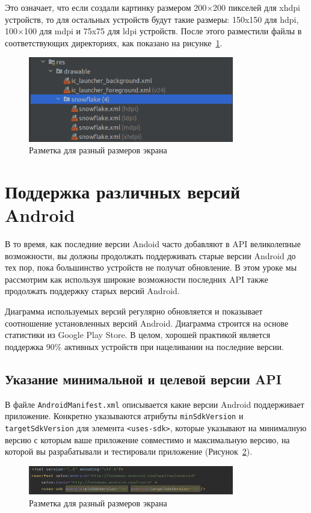 Это означает, что если создали картинку размером 200×200 пикселей для
xhdpi устройств, то для остальных устройств будут такие размеры: 150x150
для hdpi, 100×100 для mdpi и 75x75 для ldpi устройств.
После этого разместили файлы в соответствующих директориях, как показано
на рисунке~\ref{fig:res:drawable}.
\begin{figure}[h!tp]
	\centering
	\includegraphics[width=0.8\textwidth]{Screenshot from 2023-02-20 20-10-08.png}
	\caption{Разметка для разный размеров экрана}
	\label{fig:res:drawable}
\end{figure}

\section{Поддержка различных версий Android}
В то время, как последние версии Andoid часто добавляют в API
великолепные возможности, вы должны продолжать поддерживать старые
версии Android до тех пор, пока большинство устройств не получат
обновление. В этом уроке мы рассмотрим как используя широкие
возможности последних API также продолжать поддержку старых версий
Android.\par
Диаграмма используемых версий регулярно обновляется и показывает
соотношение установленных версий Android. Диаграмма строится на основе
статистики из Google Play Store. В целом, хорошей практикой является
поддержка 90\% активных устройств при нацеливании на последние версии.

\subsection{Указание минимальной и целевой версии API}
В файле \texttt{AndroidManifest.xml} описывается какие версии Android
поддерживает приложение. Конкретно указываются атрибуты
\texttt{minSdkVersion} и \texttt{targetSdkVersion} для
элемента \texttt{<uses-sdk>}, которые указывают на минималную версию
с которым ваше приложение совместимо и максимальную версию,
на которой вы разрабатывали и тестировали приложение
(Рисунок~\ref{fig:manifest}).
\begin{figure}[h!tp]
	\centering
	\includegraphics[width=0.8\textwidth]{Screenshot from 2023-02-20 20-20-10.png}
	\caption{Разметка для разный размеров экрана}
	\label{fig:manifest}
\end{figure}

